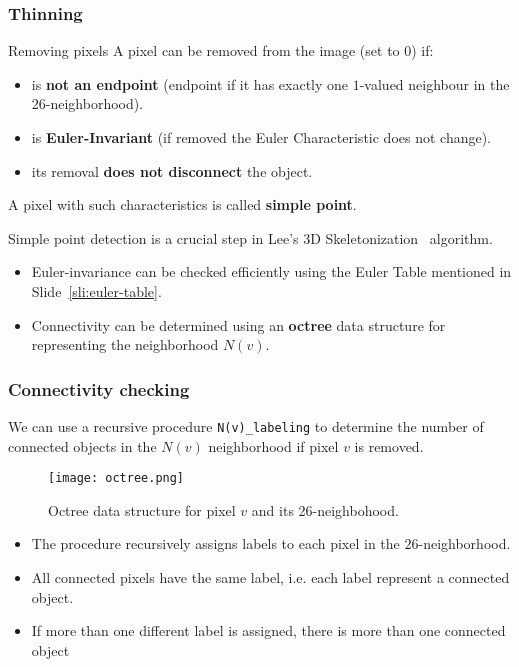 \begin{frame}
  \frametitle{Thinning}
  \begin{block}{Removing pixels}
    A pixel can be removed from the image (set to 0) if:
    \begin{itemize}
      \item is \textbf{not an endpoint} (endpoint if it has exactly one $1$-valued neighbour in the $26$-neighborhood).
      \item is \textbf{Euler-Invariant} (if removed the Euler Characteristic does not change).
      \item its removal \textbf{does not disconnect} the object.
    \end{itemize}
    A pixel with such characteristics is called \textbf{simple point}.
  \end{block}
  Simple point detection is a crucial step in Lee's 3D Skeletonization~\cite{lee94} algorithm.
  \begin{itemize}
    \item Euler-invariance can be checked efficiently using the Euler Table mentioned in Slide~\vref{sli:euler-table}.
    \item Connectivity can be determined using an \textbf{octree} data structure for representing the neighborhood $N(v)$.
  \end{itemize}
\end{frame}

\begin{frame}
  \frametitle{Connectivity checking}
  We can use a recursive procedure \lstinline{N(v)_labeling} to determine the number of connected objects in the $N(v)$ neighborhood if pixel $v$ is removed.
  \begin{figure}
    \centering
    \texttt{[image: octree.png]}
    \caption{Octree data structure for pixel $v$ and its 26-neighbohood.}
  \end{figure}
  \begin{itemize}
    \item The procedure recursively assigns labels to each pixel in the $26$-neighborhood.
    \item All connected pixels have the same label, i.e. each label represent a connected object.
    \item If more than one different label is assigned, there is more than one connected object
  \end{itemize}
\end{frame}

